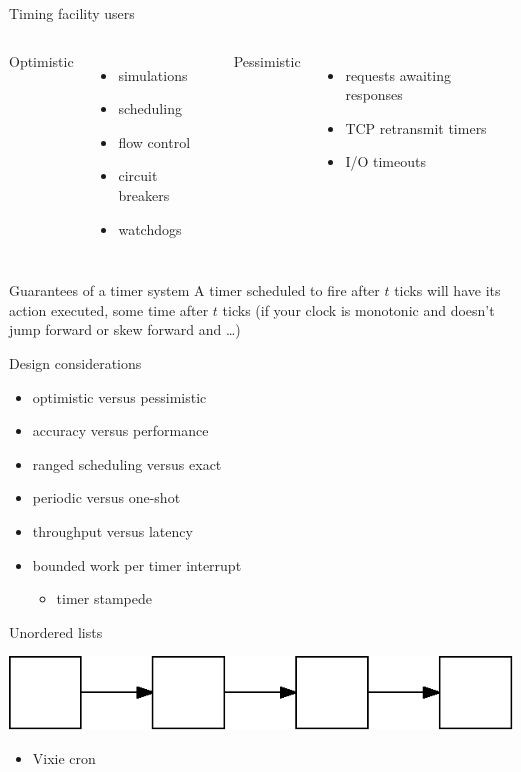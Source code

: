 \documentclass{beamer}
\begin{document}
\begin{frame}{Timing facility users}
  \begin{columns}[t]
    \centering
    Optimistic\\[.2cm]
    \begin{itemize}
      \item simulations
      \item scheduling
      \item flow control
      \item circuit breakers
      \item watchdogs
    \end{itemize}
    \centering
    Pessimistic\\[.2cm]
    \begin{itemize}
    \item requests awaiting responses
    \item TCP retransmit timers
    \item I/O timeouts
    \end{itemize}
  \end{columns}
\end{frame}

\begin{frame}{Guarantees of a timer system}
  A timer scheduled to fire after $t$ ticks will have its action
  executed, some time after $t$ ticks (if your clock is monotonic and
  doesn't jump forward or skew forward and \ldots)
\end{frame}

\begin{frame}{Design considerations}
  \begin{itemize}
  \item optimistic versus pessimistic
  \item accuracy versus performance
  \item ranged scheduling versus exact
  \item periodic versus one-shot
  \item throughput versus latency
  \item bounded work per timer interrupt
    \begin{itemize}
    \item timer stampede
    \end{itemize}
  \end{itemize}
\end{frame}


\begin{frame}{Unordered lists}
  \begin{center}
    \includegraphics{unordered-list.eps}
  \end{center}
  \begin{itemize}
  \item{Vixie cron}
  \end{itemize}
\end{frame}
\end{document}
